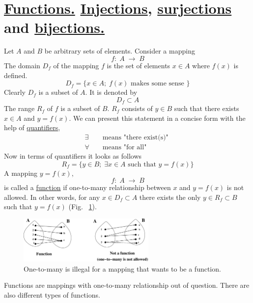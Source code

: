 \documentclass[color=black,11pt]{elegantpaper}
\begin{document}
\section{\href{https://en.wikipedia.org/wiki/Function_(mathematics)}{Functions.} \href{https://en.wikipedia.org/wiki/Injective_function}{Injections}, \href{https://en.wikipedia.org/wiki/Surjective_function}{surjections} and \href{https://en.wikipedia.org/wiki/Bijection}{bijections.}}
Let $A$ and $B$ be arbitrary sets of elements. Consider a mapping
$$
f:\;A\;\to \; B
$$
The domain $D_f$ of the mapping $f$ is the set of elements $x\in A$ where $f(x)$ is defined.
$$
D_f = \{ x\in A;\; f(x) \mbox{ makes some sense } \}
$$ 
Clearly $D_f$ is a subset of $A.$ It is denoted by 
$$
D_f \subset A
$$
 The range $R_f$ of $f$ is a subset of $B.$ $R_f$ consists of $y \in B$ such that there exists $x \in A$ and $y = f(x).$ We can present this statement in a concise form with the help of \href{https://en.wikipedia.org/wiki/Quantifier_(logic)}{quantifiers},
\begin{eqnarray*}
\exists && \mbox{  means "there exist(s)" }\\
\forall && \mbox{ means "for all" } \nonumber
\end{eqnarray*}
Now in terms of quantifiers it looks as follows
$$
R_f = \{y \in B;\;\exists x \in A \mbox{ such that } y = f(x) \}
$$ 
A mapping $y = f(x),$
$$
f:\;A\;\to \; B
$$
is called a \href{https://en.wikipedia.org/wiki/Function_(mathematics)}{function} if one-to-many relationship between $x$ and $y=f(x)$ is not allowed. In other words, for any $x \in D_f \subset  A$ there exists the only $y \in R_f \subset B$ such that $y = f(x)$ (Fig. ~\ref{fig:ConceptOfFunction}).

\begin{figure}[htbp]
  \centering
  \includegraphics[width=0.6\textwidth]{xfig_stuff/ConceptOfAFunction.eps}
  \caption{One-to-many is illegal for a mapping that wants to be a function.} 
  \label{fig:ConceptOfFunction}
\end{figure}
Functions are mappings with one-to-many relationship out of question. There are also different types of functions.
\end{document}
